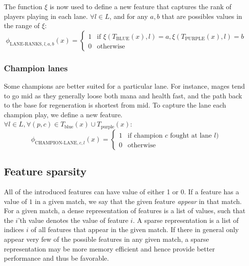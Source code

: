The function $\xi$ is now used to define a new feature that captures the rank of players playing in each lane.
$\forall l \in L$, and for any $a,b$ that are possibles values in the range of $\xi$:
\begin{equation}\label{eq:laneranks}
\phi_{\text{LANE-RANKS},l,a,b}(x) =
\begin{cases} 
  1 & \text{if } \xi(T_\text{BLUE}(x),l) = a, \xi(T_\text{PURPLE}(x),l) = b\\
  0 & \text{otherwise} 
\end{cases}  
\end{equation}


\subsubsection{Champion lanes}
Some champions are better suited for a particular lane. For instance, mages tend to go mid as they generally loose both mana and health fast, and the path back to the base for regeneration is shortest from mid. To capture the lane each champion play, we define a new feature.
$\forall l \in L, \forall(p, c) \in T_\text{blue}(x) \cup T_\text{purple}(x)$:
\begin{equation}\label{eq:championlane}
  \phi_{\text{CHAMPION-LANE},c,l}(x) =
\begin{cases} 
  1 & \text{if champion } c \text{ fought at lane } l)\\
  0 & \text{otherwise} 
\end{cases}
\end{equation}

\subsection{Feature sparsity}\label{sec:featuresparsity}
All of the introduced features can have value of either 1 or 0. If a feature has a value of $1$ in a given match, we say that the given feature \textit{appear} in that match.
For a given match, a dense representation of features is a list of values, such that the $i$'th value denotes the value of feature $i$.
A sparse representation is a list of indices $i$ of all features that appear in the given match.
If there in general only appear very few of the possible features in any given match, a sparse representation may be more memory efficient and hence provide better performance  and thus be favorable.

